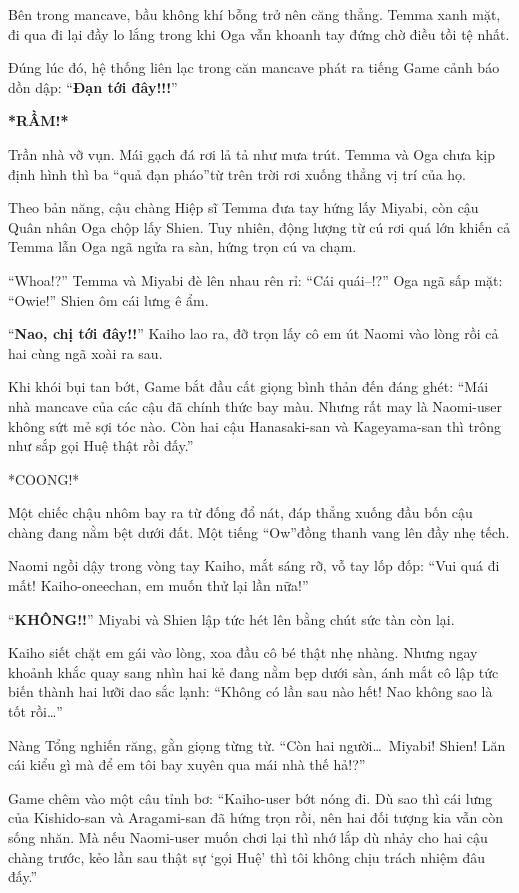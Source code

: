 \documentclass[../main.tex]{subfiles}
\begin{document}

Bên trong mancave, bầu không khí bỗng trở nên căng thẳng. Temma xanh mặt, đi qua đi lại đầy lo lắng trong khi Oga vẫn khoanh tay đứng chờ điều tồi tệ nhất.

Đúng lúc đó, hệ thống liên lạc trong căn mancave phát ra tiếng Game cảnh báo dồn dập: ``\textbf{Đạn tới đây!!!}''

\textbf{*RẦM!*}

Trần nhà vỡ vụn. Mái gạch đá rơi lả tả như mưa trút. Temma và Oga chưa kịp định hình thì ba ``quả đạn pháo''từ trên trời rơi xuống thẳng vị trí của họ.

Theo bản năng, cậu chàng Hiệp sĩ Temma đưa tay hứng lấy Miyabi, còn cậu Quân nhân Oga chộp lấy Shien. Tuy nhiên, động lượng từ cú rơi quá lớn khiến cả Temma lẫn Oga ngã ngửa ra sàn, hứng trọn cú va chạm.

``Whoa!?'' Temma và Miyabi đè lên nhau rên rỉ: ``Cái quái--!?'' Oga ngã sấp mặt: ``Owie!'' Shien ôm cái lưng ê ẩm.

``\textbf{Nao, chị tới đây!!}'' Kaiho lao ra, đỡ trọn lấy cô em út Naomi vào lòng rồi cả hai cùng ngã xoài ra sau.

Khi khói bụi tan bớt, Game bắt đầu cất giọng bình thản đến đáng ghét: ``Mái nhà mancave của các cậu đã chính thức bay màu. Nhưng rất may là Naomi-user không sứt mẻ sợi tóc nào. Còn hai cậu Hanasaki-san và Kageyama-san thì trông như sắp gọi Huệ thật rồi đấy.''

*COONG!*

Một chiếc chậu nhôm bay ra từ đống đổ nát, đáp thẳng xuống đầu bốn cậu chàng đang nằm bệt dưới đất. Một tiếng ``Ow''đồng thanh vang lên đầy nhẹ tếch.


Naomi ngồi dậy trong vòng tay Kaiho, mắt sáng rỡ, vỗ tay lốp đốp: ``Vui quá đi mất! Kaiho-oneechan, em muốn thử lại lần nữa!''

``\textbf{KHÔNG!!}'' Miyabi và Shien lập tức hét lên bằng chút sức tàn còn lại.

Kaiho siết chặt em gái vào lòng, xoa đầu cô bé thật nhẹ nhàng. Nhưng ngay khoảnh khắc quay sang nhìn hai kẻ đang nằm bẹp dưới sàn, ánh mắt cô lập tức biến thành hai lưỡi dao sắc lạnh: ``Không có lần sau nào hết! Nao không sao là tốt rồi\dots''

Nàng Tổng nghiến răng, gằn giọng từng từ. ``Còn hai người\dots\ Miyabi! Shien! Lăn cái kiểu gì mà để em tôi bay xuyên qua mái nhà thế hả!?''

Game chêm vào một câu tỉnh bơ: ``Kaiho-user bớt nóng đi. Dù sao thì cái lưng của Kishido-san và Aragami-san đã hứng trọn rồi, nên hai đối tượng kia vẫn còn sống nhăn. Mà nếu Naomi-user muốn chơi lại thì nhớ lắp dù nhảy cho hai cậu chàng trước, kẻo lần sau thật sự `gọi Huệ' thì tôi không chịu trách nhiệm đâu đấy.''
\end{document}
